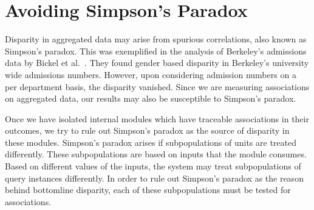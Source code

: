 \documentclass[10pt, onecolumn]{report}
\begin{document}


%

\section{Avoiding Simpson's Paradox}\label{sec:simpson}

Disparity in aggregated data may arise from spurious correlations, also known
as Simpson's paradox. This was exemplified in the analysis 
of Berkeley's admissions data  by Bickel et al.~\cite{bickel1975sex}. 
They found gender based disparity in Berkeley's university wide admissions 
numbers. However, upon considering admission numbers on a 
per department basis, the disparity vanished. Since we are measuring
associations on aggregated data, our results may also be susceptible
to Simpson's paradox.

Once we have isolated internal modules which have
traceable associations in their outcomes, we try to rule out 
Simpson's paradox as the source of disparity in these modules. 
Simpson's paradox arises if subpopulations of units are treated differently. 
These subpopulations are based on inputs that the module consumes. 
Based on different values of the inputs, the system may treat subpopulations of 
query instances differently. In order to rule out Simpson's paradox as the reason 
behind bottomline disparity, each of these subpopulations must be tested for associations. 
\end{document}
